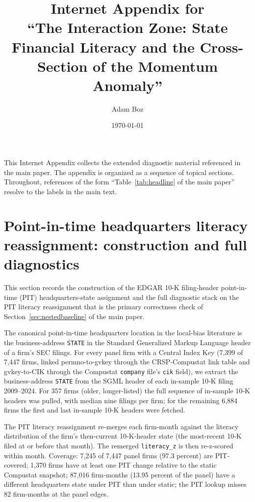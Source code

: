 \documentclass[12pt]{article}
\title{Internet Appendix for\\ ``The Interaction Zone: State Financial Literacy and the Cross-Section of the Momentum Anomaly''}
\author{Adam Boz}
\date{\today}
\begin{document}
\maketitle

\noindent This Internet Appendix collects the extended diagnostic material referenced in the main paper. The appendix is organized as a sequence of topical sections. Throughout, references of the form ``Table~\ref{tab:headline} of the main paper'' resolve to the labels in the main text.

\tableofcontents
\newpage

\appendix

\section{Point-in-time headquarters literacy reassignment: construction and full diagnostics}
\label{ia:pit}

This section records the construction of the EDGAR 10-K filing-header point-in-time (PIT) headquarters-state assignment and the full diagnostic stack on the PIT literacy reassignment that is the primary correctness check of Section~\ref{sec:nestedbaseline} of the main paper.

The canonical point-in-time headquarters location in the local-bias literature \citep{covalMoskowitz1999, pirinskyWang2006} is the business-address \texttt{STATE} in the Standard Generalized Markup Language header of a firm's SEC filings. For every panel firm with a Central Index Key (7,399 of 7,447 firms, linked permno-to-gvkey through the CRSP-Compustat link table and gvkey-to-CIK through the Compustat \texttt{company} file's \texttt{cik} field), we extract the business-address \texttt{STATE} from the SGML header of each in-sample 10-K filing 2009--2024. For 357 firms (older, longer-listed) the full sequence of in-sample 10-K headers was pulled, with median nine filings per firm; for the remaining 6,884 firms the first and last in-sample 10-K headers were fetched.

The PIT literacy reassignment re-merges each firm-month against the literacy distribution of the firm's then-current 10-K-header state (the most-recent 10-K filed at or before that month). The remerged \texttt{literacy\_z} is then re-z-scored within month. Coverage: 7,245 of 7,447 panel firms (97.3 percent) are PIT-covered; 1,370 firms have at least one PIT change relative to the static Compustat snapshot; 87,016 firm-months (13.95 percent of the panel) have a different headquarters state under PIT than under static; the PIT lookup misses 82 firm-months at the panel edges.
\end{document}
